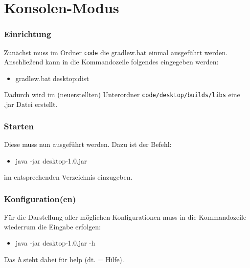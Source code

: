 \documentclass[12pt,a4paper,oneside]{book}
\theoremstyle{plain}
\numberwithin{equation}{chapter} \DeclareMathOperator{\Var}{Var}
\begin{document}
\chapter{Konsolen-Modus}
\subsection{Einrichtung}
    Zunächst muss im Ordner \texttt{code} die gradlew.bat einmal ausgeführt werden. Anschließend kann in die Kommandozeile folgendes eingegeben werden:
    \begin{itemize}
        \item gradlew.bat desktop:dist
    \end{itemize}
    Dadurch wird im (neuerstellten) Unterordner \texttt{code/desktop/builds/libs} eine .jar Datei erstellt.
    
\subsection{Starten}
    Diese muss nun ausgeführt werden. Dazu ist der Befehl:
    \begin{itemize}
        \item java -jar desktop-1.0.jar
    \end{itemize}
    im entsprechenden Verzeichnis einzugeben.

\subsection{Konfiguration(en)}
    Für die Darstellung aller möglichen Konfigurationen muss in die Kommandozeile wiederrum die Eingabe erfolgen:
    \begin{itemize}
        \item java -jar desktop-1.0.jar -h
    \end{itemize}
    Das \textit{h} steht dabei für help (dt. = Hilfe).
\end{document}

